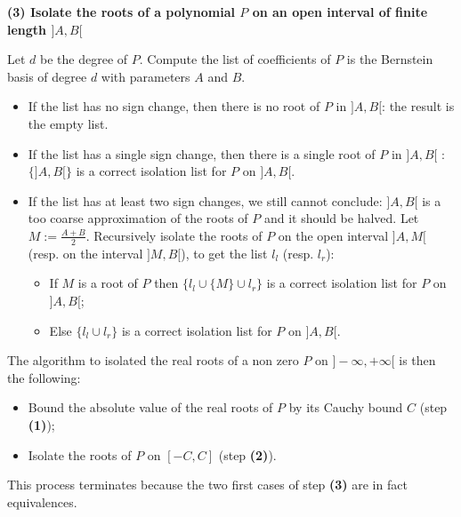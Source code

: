 \documentclass{mscs}
\begin{document}
{\bf (3) Isolate the roots of a polynomial $P$ on an open interval of
  finite length $]A, B[$}

\noindent Let $d$ be the degree of $P$. Compute the list of
coefficients of $P$ is the Bernstein basis of degree $d$ with
parameters $A$ and $B$.

\begin{itemize}
\item If the list has no sign change, then there is no root of $P$
  in $]A, B[$: the result is the empty list.
\item If the list has a single sign change, then there is a single
  root of $P$ in $]A, B[$ : $\{]A, B[\}$ is a correct isolation
  list for $P$ on $]A, B[$.
\item If the list has at least two sign changes, we still cannot
  conclude: $]A, B[$  is a too coarse approximation of the roots of
  $P$ and it should be halved. Let $M := \frac{A +
    B}{2}$. Recursively isolate the roots of $P$ on the open interval
  $]A, M[$ (resp. on the interval $]M, B[$), to get the list $l_l$
  (resp. $l_r$):
  \begin{itemize}
  \item If $M$ is a root of $P$ then
    $\{l_l \cup \{M\} \cup l_r\}$ is a correct isolation list for $P$
    on $]A, B[$;
  \item Else  $\{l_l \cup l_r\}$ is a correct isolation list for $P$
    on $]A, B[$.
  \end{itemize}
\end{itemize}

The algorithm to isolated the real roots of a non zero $P$ on $]-\infty,
+\infty[$ is then the following:

\begin{itemize}
\item Bound the absolute value of the real roots of $P$ by its Cauchy
  bound $C$ (step {\bf (1)});
\item Isolate the roots of $P$ on $[-C, C]$ (step {\bf (2)}).
\end{itemize}

This process terminates because the two first cases of step {\bf (3)}
are in fact equivalences.
\end{document}
